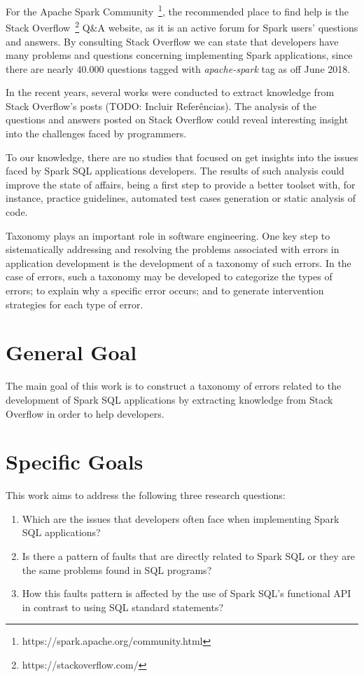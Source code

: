 For the Apache Spark Community~\footnote{https://spark.apache.org/community.html}, the recommended place to find help is the Stack Overflow~\footnote{https://stackoverflow.com/} Q\&A website, as it is an active forum for Spark users’ questions and answers. By consulting Stack Overflow we can state that developers have many problems and questions concerning implementing Spark applications, since there are nearly 40.000 questions tagged with \emph{apache-spark} tag as off June 2018.

In the recent years, several works were conducted  to extract knowledge from Stack Overflow's posts (TODO: Incluir Referências). The analysis of the questions and answers posted on Stack Overflow could reveal interesting insight into the challenges faced
by programmers.

To our knowledge, there are no studies that focused on get insights into the issues faced by Spark SQL applications developers. The results of such analysis could improve the state of affairs, being a first step to provide a better toolset with, for instance, practice guidelines, automated test cases generation or static analysis of code.

Taxonomy plays an important role in software engineering. One key step to sistematically addressing and resolving the problems associated with errors in application development is the development of a taxonomy of such errors. In the case of errors, such a taxonomy may be developed to categorize the types of errors; to explain why a specific error occurs; and to generate intervention strategies for each type of error.

\section{General Goal}

The main goal of this work is to construct a taxonomy of errors related to the development of Spark SQL applications by extracting knowledge from Stack Overflow in order to help developers.

\section{Specific Goals}

This work aims to address the following three research questions:

\begin{enumerate}
    \item Which are the issues that developers often face when implementing Spark SQL applications?
    \item Is there a pattern of faults that are directly related to Spark SQL or they are the same problems found in SQL programs?
    \item How this faults pattern is affected by the use of Spark SQL's functional API in contrast to using SQL standard statements?
\end{enumerate}

